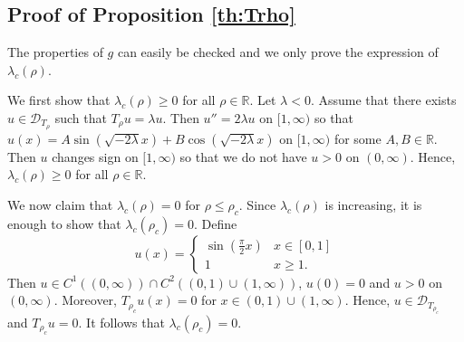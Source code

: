 \documentclass[11pt]{article}
\theoremstyle{plain}
\begin{document}
\newtheorem{lem}{Lemma}[section]
\begin{appendix}

\section{Proof of Proposition \ref{th:Trho}} \label{proof:15}

The properties of $g$ can easily be checked and we only prove the expression of $\lambda_c(\rho)$.

We first show that $\lambda_c(\rho) \ge 0$ for all $\rho\in\mathbb{R}$. Let $\lambda < 0$. Assume that there exists  $u\in \mathcal D_{T_\rho}$ such that $T_\rho u = \lambda u$. Then $u'' = 2\lambda u$ on $[1,\infty)$ so that $u(x) = A \sin(\sqrt{-2\lambda}x) + B\cos(\sqrt{-2\lambda}x)$ on $[1,\infty)$ for some $A,B\in\mathbb{R}$. Then $u$ changes sign on $[1,\infty)$ so that we do not have $u>0$ on $(0,\infty)$. Hence, $\lambda_c(\rho) \ge 0$ for all $\rho\in\mathbb{R}$.

We now claim that $\lambda_c(\rho) = 0$ for $\rho \le \rho_c$. Since $\lambda_c(\rho)$ is increasing, it is enough to show that $\lambda_c(\rho_c) = 0$. Define
\[
u(x) = \begin{cases}
\sin(\frac{\pi}{2}x)& x\in[0,1]\\
1&x\ge 1.
 \end{cases}
 \]
Then $u\in C^1((0,\infty))\cap C^2((0,1)\cup(1,\infty))$, $u(0) = 0$ and $u>0$ on $(0,\infty)$. Moreover, $T_{\rho_c}u(x) = 0$ for $x\in (0,1)\cup(1,\infty)$. Hence, $u\in \mathcal D_{T_{\rho_c}}$ and $T_{\rho_c} u = 0$. It follows that $\lambda_c(\rho_c) = 0.$


\end{appendix}
\end{document}
